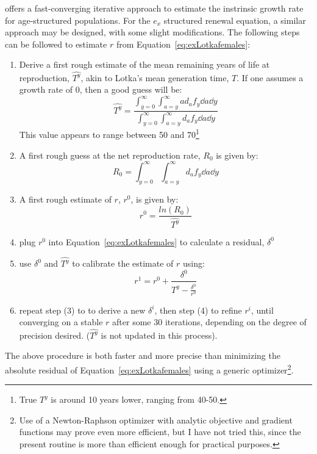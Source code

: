  \FloatBarrier
\label{sec:exrenewalit}
\citet{coale1957new} offers a fast-converging iterative approach to estimate the
instrinsic growth rate for age-structured populations. For the $e_x$ structured
renewal equation, a similar approach may be designed, with some slight
modifications. The following steps can be followed to estimate $r$ from
Equation~\ref{eq:exLotkafemales}:

\begin{enumerate}
  \item Derive a first rough estimate of the mean remaining years of life at
  reproduction, $\widehat{T^y}$, akin to Lotka's mean generation time, $T$. If
  one assumes a growth rate of $0$, then a good guess will be:
\begin{equation}
\widehat{T^y} = \frac{\int _{y=0}^\infty \int _{a=y}^\infty a d_a f_y \dd a
\dd y}{\int _{y=0}^\infty \int _{a=y}^\infty d_a f_y \dd a \dd y}
\end{equation}
 This value appears to range between 50 and 70\footnote{True $T^y$ is around 10
 years lower, ranging from 40-50.}
  \item A first rough guess at the net reproduction rate, $R_0$ is given by:
 \begin{equation}
  R_0 = \int _{y=0}^\infty \int _{a=y}^\infty d_a f_y \dd a
\dd y
\end{equation}
  \item A first rough estimate of $r$, $r^0$, is given by:
   \begin{equation}
   r^0 = \frac{ln(R_0)}{\widehat{T^y}}
   \end{equation}
  \item plug $r^0$ into Equation~\ref{eq:exLotkafemales} to calculate a
  residual, $\delta^0$
  \item use $\delta^0$ and $\widehat{T^y}$ to calibrate the estimate of $r$
  using:
  \begin{equation}
  r^{1} = r^0 + \frac{\delta^0}{\widehat{T^y} - \frac{\delta^0}{r^0}}
  \end{equation}
  \item repeat step (3) to to derive a new $\delta^i$, then step (4) to refine
  $r^i$, until converging on a stable $r$ after some 30 iterations,
  depending on the degree of precision desired. ($\widehat{T^y}$ is not updated
  in this process).
\end{enumerate}

The above procedure is both faster and more precise than minimizing the absolute
residual of Equation~\ref{eq:exLotkafemales} using a generic
optimizer\footnote{Use of a Newton-Raphson optimizer with analytic objective
and gradient functions may prove even more efficient, but I have not tried
this, since the present routine is more than efficient enough for practical
purposes.}.
